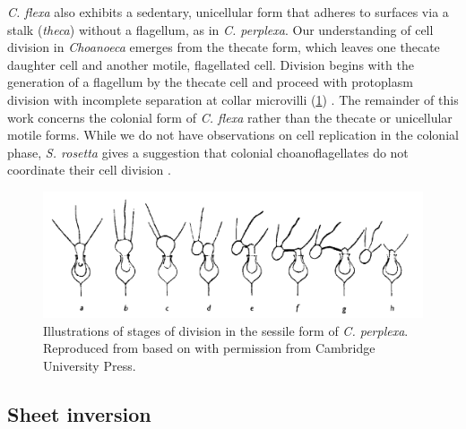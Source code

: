\textit{C. flexa} also exhibits a sedentary, unicellular form that adheres to surfaces via a stalk (\textit{theca}) without a flagellum, as in \textit{C. perplexa}.
Our understanding of cell division in \textit{Choanoeca} emerges from the thecate form, which leaves one thecate daughter cell and another motile, flagellated cell.
Division begins with the generation of a flagellum by the thecate cell and proceed with protoplasm division with incomplete separation at collar microvilli (\cref{fig:division}) \citep{ellis1930,leadbeater1977}.
The remainder of this work concerns the colonial form of \textit{C. flexa} rather than the thecate or unicellular motile forms.
While we do not have observations on cell replication in the colonial phase, \textit{S. rosetta} gives a suggestion that colonial choanoflagellates do not coordinate their cell division \citep{fairclough2010}.

\begin{figure}[htbp]
	\centering
	\includegraphics[width=\textwidth]{division.png}
	\caption[Illustrations of stages of division in the sessile form of \textit{C. perplexa}]{Illustrations of stages of division in the sessile form of \textit{C. perplexa}. Reproduced from \citet{leadbeater1977} based on \citet{ellis1930} with permission from Cambridge University Press.}
	\label{fig:division}
\end{figure}


\subsection{Sheet inversion}

